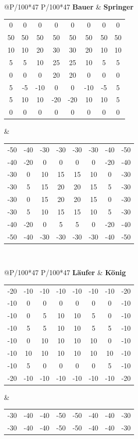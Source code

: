 \begin{table}[htbp]
\tiny
{}
\begin{tabular}{@{}P{\textwidth/100*47} P{\textwidth/100*47}}
\textbf{Bauer} & \textbf{Springer}\\
\begin{tabular}{@{}c c c c c c c c}
0&0&0&0&0&0&0&0\\
50&50&50&50&50&50&50&50\\
10&10&20&30&30&20&10&10\\
5&5&10&25&25&10&5&5\\
0&0&0&20&20&0&0&0\\
5&-5&-10&0&0&-10&-5&5\\
5&10&10&-20&-20&10&10&5\\
0&0&0&0&0&0&0&0
\end{tabular}
&
\begin{tabular}{c c c c c c c c}
-50&-40&-30&-30&-30&-30&-40&-50\\
-40&-20&0&0&0&0&-20&-40\\
-30&0&10&15&15&10&0&-30\\
-30&5&15&20&20&15&5&-30\\
-30&0&15&20&20&15&0&-30\\
-30&5&10&15&15&10&5&-30\\
-40&-20&0&5&5&0&-20&-40\\
-50&-40&-30&-30&-30&-30&-40&-50\\
\end{tabular}
\end{tabular}\\
\begin{tabular}{@{}P{\textwidth/100*47} P{\textwidth/100*47}}
\textbf{Läufer} & \textbf{König}\\
\begin{tabular}{@{}c c c c c c c c}
-20&-10&-10&-10&-10&-10&-10&-20\\
-10&0&0&0&0&0&0&-10\\
-10&0&5&10&10&5&0&-10\\
-10&5&5&10&10&5&5&-10\\
-10&0&10&10&10&10&0&-10\\
-10&10&10&10&10&10&10&-10\\
-10&5&0&0&0&0&5&-10\\
-20&-10&-10&-10&-10&-10&-10&-20
\end{tabular}
&
\begin{tabular}{c c c c c c c c}
-30&-40&-40&-50&-50&-40&-40&-30\\
-30&-40&-40&-50&-50&-40&-40&-30\\

\end{tabular}
\end{tabular}
\end{table}
